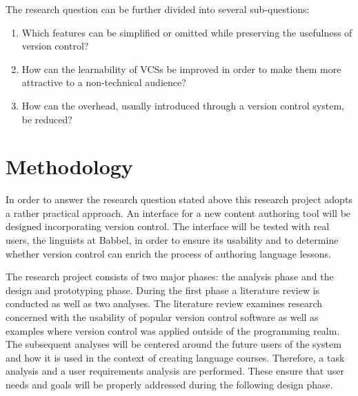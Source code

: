 \noindent %
The research question can be further divided into several sub-questions:

\begin{enumerate}
  \item Which features can be simplified or omitted while  preserving the usefulness of version control?
  \item How can the learnability of VCSs be improved in order to make them more attractive to a non-technical audience? 
  \item How can the overhead, usually introduced through a version control system, be reduced?
\end{enumerate}

\section{Methodology}
In order to answer the research question stated above this research project adopts a rather practical approach. An interface for a new content authoring tool will be designed incorporating version control. The interface will be tested with real users, the linguists at Babbel, in order to ensure its usability and to determine whether version control can enrich the process of authoring language lessons. 

The research project consists of two major phases: the analysis phase and the design and prototyping phase. During the first phase a literature review is conducted as well as two analyses. The literature review examines research concerned with the usability of popular version control software as well as examples where version control was applied outside of the programming realm. The subsequent analyses will be centered around the future users of the system and how it is used in the context of creating language courses. Therefore, a task analysis and a user requirements analysis are performed. These ensure that user needs and goals will be properly addressed during the following design phase. 

